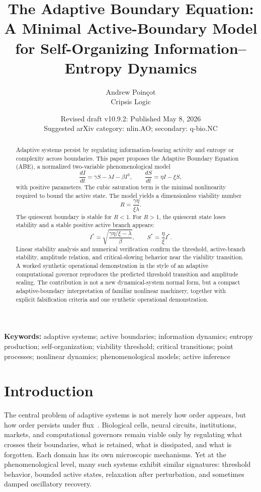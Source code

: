 \documentclass[11pt]{article}
\title{\textbf{The Adaptive Boundary Equation:}\\
A Minimal Active-Boundary Model for Self-Organizing Information--Entropy Dynamics}
\author{Andrew Poinçot\\Cripsis Logic}
\date{Revised draft v10.9.2: Published May 8, 2026\\Suggested arXiv category: nlin.AO; secondary: q-bio.NC}
\begin{document}
\maketitle

\begin{abstract}
Adaptive systems persist by regulating information-bearing activity and entropy or complexity across boundaries. This paper proposes the Adaptive Boundary Equation (ABE), a normalized two-variable phenomenological model
\begin{equation*}
\frac{dI}{dt}=\gamma S-\lambda I-\beta I^3,\qquad
\frac{dS}{dt}=\eta I-\xi S,
\end{equation*}
with positive parameters. The cubic saturation term is the minimal nonlinearity required to bound the active state. The model yields a dimensionless viability number
\begin{equation*}
R=\frac{\gamma\eta}{\xi\lambda}.
\end{equation*}
The quiescent boundary is stable for $R<1$. For $R>1$, the quiescent state loses stability and a stable positive active branch appears:
\begin{equation*}
I^*=\sqrt{\frac{\gamma\eta/\xi-\lambda}{\beta}},\qquad S^*=\frac{\eta}{\xi}I^*.
\end{equation*}
Linear stability analysis and numerical verification confirm the threshold, active-branch stability, amplitude relation, and critical-slowing behavior near the viability transition. A worked synthetic operational demonstration in the style of an adaptive computational governor reproduces the predicted threshold transition and amplitude scaling. The contribution is not a new dynamical-system normal form, but a compact adaptive-boundary interpretation of familiar nonlinear machinery, together with explicit falsification criteria and one synthetic operational demonstration.
\end{abstract}

\noindent\textbf{Keywords:} adaptive systems; active boundaries; information dynamics; entropy production; self-organization; viability threshold; critical transitions; point processes; nonlinear dynamics; phenomenological models; active inference

\clearpage
\section{Introduction}
The central problem of adaptive systems is not merely how order appears, but how order persists under flux~\cite{schrodinger1944life}. Biological cells, neural circuits, institutions, markets, and computational governors remain viable only by regulating what crosses their boundaries, what is retained, what is dissipated, and what is forgotten. Each domain has its own microscopic mechanisms. Yet at the phenomenological level, many such systems exhibit similar signatures: threshold behavior, bounded active states, relaxation after perturbation, and sometimes damped oscillatory recovery.
\end{document}
